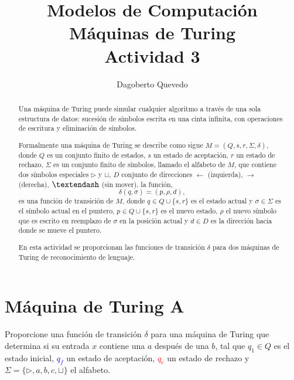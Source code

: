\documentclass[letterpaper,11pt]{article}
\begin{document}
\title{Modelos de Computación\\\large Máquinas de Turing\\\large Actividad 3}
\author{Dagoberto Quevedo}
\maketitle

\begin{abstract}
Una máquina de Turing puede simular cualquier algoritmo a través de una sola estructura de datos: sucesión de símbolos escrita en una cinta infinita, con operaciones de escritura y eliminación de símbolos.

Formalmente una máquina de Turing se describe como sigue $M = (Q,s,r,\Sigma,\delta)$, donde $Q$ es un conjunto finito de estados, $s$ un estado de aceptación, $r$ un estado de rechazo, $\Sigma$ es un conjunto finito de símbolos, llamado el alfabeto de $M$, que contiene dos símbolos especiales $\rhd$ y $\sqcup$, $D$ conjunto de direcciones $\leftarrow$ (izquierda), $\rightarrow$ (derecha), $\textendash$ (sin mover), la función,
\begin{equation}
\delta(q,\sigma)=(p,\rho,d),
\end{equation}
es una función de transición de $M$, donde $q\in Q\cup\{s,r\}$ es el estado actual y $\sigma\in\Sigma$ es el símbolo actual en el puntero, $p\in Q\cup\{s,r\}$ es el nuevo estado, $\rho$ el nuevo símbolo que es escrito en reemplazo de $\sigma$ en la posición actual y $d\in D$ es la dirección hacia donde se mueve el puntero.

En esta actividad se proporcionan las funciones de transición $\delta$ para dos máquinas de Turing de reconocimiento de lenguaje.

\end{abstract}


\section{Máquina de Turing A}
Proporcione una función de transición $\delta$ para una máquina de Turing que determina si su entrada $x$ contiene una $a$ después de una $b$, tal que $q_1\in Q$ es el estado inicial, \textcolor{blue}{$q_f$} un estado de aceptación, \textcolor{red}{$q_e$} un estado de rechazo y $\Sigma = \{\rhd,a,b,c,\sqcup\}$ el alfabeto.

\break
\end{document}
